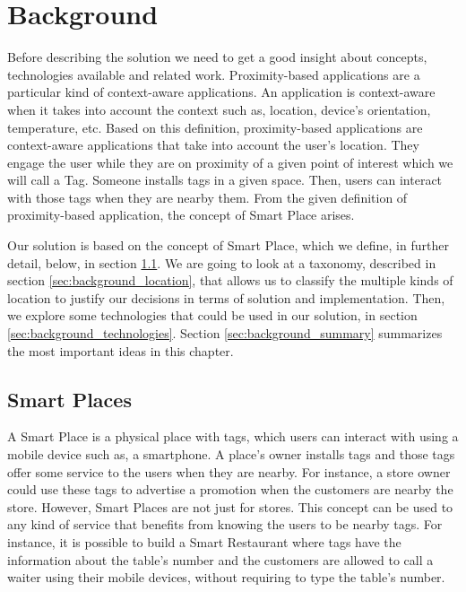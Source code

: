 
\chapter{Background}
\label{chapter:background}
Before describing the solution we need to get a good insight about concepts, technologies available and related work.
Proximity-based applications are a particular kind of context-aware applications.
An application is context-aware when it takes into account the context such as, location, device's orientation, temperature, etc.
Based on this definition, proximity-based applications are context-aware applications that take into account the user's location.
They engage the user while they are on proximity of a given point of interest which we will call a Tag.
Someone installs tags in a given space.
Then, users can interact with those tags when they are nearby them.
From the given definition of proximity-based application, the concept of Smart Place arises.

Our solution is based on the concept of Smart Place, which we define, in further detail, below, in section \ref{sec:background_smart_places}.
We are going to look at a taxonomy, described in section \ref{sec:background_location}, that allows us to classify the multiple kinds of location to justify our decisions in terms of solution and implementation.
Then, we explore some technologies that could be used in our solution, in section \ref{sec:background_technologies}.
Section \ref{sec:background_summary} summarizes the most important ideas in this chapter.

\section{Smart Places}
\label{sec:background_smart_places}
A Smart Place is a physical place with tags, which users can interact with using a mobile device such as, a smartphone.
A place's owner installs tags and those tags offer some service to the users when they are nearby.
For instance, a store owner could use these tags to advertise a promotion when the customers are nearby the store.
However, Smart Places are not just for stores.
This concept can be used to any kind of service that benefits from knowing the users to be nearby tags.
For instance, it is possible to build a Smart Restaurant where tags have the information about the table's number and the customers are allowed to call a waiter using their mobile devices, without requiring to type the table's number.

